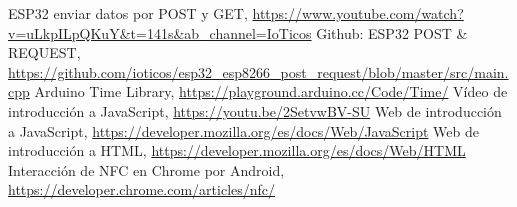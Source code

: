 \documentclass[12pt]{report}
\begin{document}
\begin{thebibliography}{8}
    ESP32 enviar datos por POST y GET, \url{https://www.youtube.com/watch?v=uLkpILpQKuY&t=141s&ab_channel=IoTicos}
        Github: ESP32 POST \& REQUEST, \url{https://github.com/ioticos/esp32_esp8266_post_request/blob/master/src/main.cpp}
     Arduino Time Library,     \url{https://playground.arduino.cc/Code/Time/}
     Vídeo de introducción a JavaScript, \url{https://youtu.be/2SetvwBV-SU}
     Web de introducción a JavaScript, \url{https://developer.mozilla.org/es/docs/Web/JavaScript}
     Web de introducción a HTML, \url{https://developer.mozilla.org/es/docs/Web/HTML}
     Interacción de NFC en Chrome por Android, \url{https://developer.chrome.com/articles/nfc/}    
\end{thebibliography}
\newpage
\end{document}
